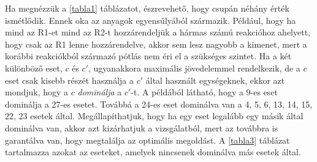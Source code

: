 Ha megnézzük a \ref{tabla1} táblázatot, észrevehető, hogy csupán néhány érték ismétlődik.
Ennek oka az anyagok egyensúlyából származik.
Például, hogy ha mind az R1-et mind az R2-t hozzárendeljük a hármas számú reakcióhoz ahelyett, hogy csak az R1 lenne hozzárendelve, akkor sem lesz nagyobb a kimenet, mert a korábbi reakciókból származó pótlás nem éri el a szükséges szintet.
Ha a két különböző eset, $c$ és $c'$, ugyanakkora maximális jövedelemmel rendelkezik, de a $c$ eset csak kisebb részét használja a $c'$ által használt egységeknek, ekkor azt mondjuk, hogy a $c$ \textit{dominálja} a $c'$-t.
A példából látható, hogy a 9-es eset dominálja a 27-es esetet.
Továbbá a 24-es eset dominálva van a 4, 5, 6, 13, 14, 15, 22, 23 esetek által.
Megállapíthatjuk, hogy ha egy eset legalább egy másik által dominálva van, akkor azt kizárhatjuk a vizsgálatból, mert az továbbra is garantálva van, hogy megtalálja az optimális megoldást.
A \ref{tabla3} táblázat tartalmazza azokat az eseteket, amelyek nincsenek dominálva más esetek által. 


